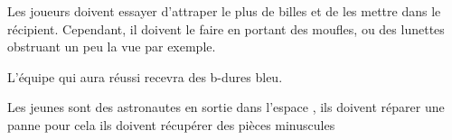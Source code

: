 \documentclass{grand-jeu}
\begin{document}
\begin{liste-materiel}
\end{liste-materiel}

\begin{regles}
Les joueurs doivent essayer d'attraper le plus de billes et de les mettre dans le récipient. Cependant, il doivent le faire en portant des moufles, ou des lunettes obstruant un peu la vue par exemple.

L’équipe qui aura réussi recevra des b-dures bleu.
\end{regles}

\begin{imaginaire}
Les jeunes sont des astronautes en sortie dans l’espace , ils doivent réparer une panne pour cela ils doivent récupérer des pièces minuscules
\end{imaginaire}

\begin{moments-stop}
\end{moments-stop}
\end{document}
